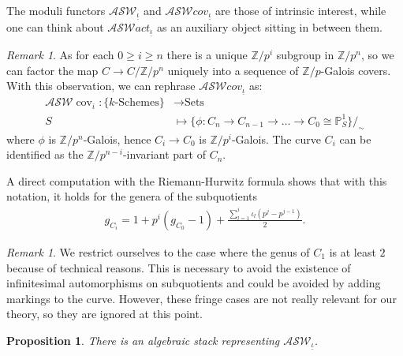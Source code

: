 \documentclass{compositio}
\newcommand{\mat}[1]{\todo[color=green]{MH: #1}}
\newtheorem{proposition}[theorem]{Proposition}
\theoremstyle{remark}
\theoremstyle{remark}
\newtheorem{remark}[theorem]{Remark}
\DeclareMathOperator{\cov}{cov}
\begin{document}
The moduli functors $\mathcal{ASW}_{\underline{\iota}}$ and $\mathcal{ASW}cov_{\underline{\iota}}$ are those of intrinsic interest, while one can think about $\mathcal{ASW}act_{\underline{\iota}}$ as an auxiliary object sitting in between them.
\begin{remark}
As for each $0 \geq i \geq n$ there is a unique $\mathbb{Z}/p^i$ subgroup in $\mathbb{Z}/p^n$, so we can factor the map $C \to C/\mathbb{Z}/p^n$ uniquely into a sequence of $\mathbb{Z}/p$-Galois covers. With this observation, we can rephrase $\mathcal{ASW}cov_{\underline{\iota}}$ as:
\begin{equation}
    \begin{split}
        \mathcal{ASW}\cov_{\overline{\iota}}: \{ k\text{-Schemes} \} & \xrightarrow{} \text{Sets} \\
        S & \mapsto \{ \phi: C_n \xrightarrow{} C_{n-1} \xrightarrow{} \ldots \xrightarrow{} C_0 \cong \mathbb{P}^1_S \}/_{\sim}
    \end{split}
\end{equation}
where $\phi$ is $\mathbb{Z}/p^n$-Galois, hence $C_i \rightarrow C_0$ is $\mathbb{Z}/p^i$-Galois. The curve $C_i$ can be identified as the $\mathbb{Z}/p^{n-i}$-invariant part of $C_n$.

A direct computation with the Riemann-Hurwitz formula shows that with this notation, it holds for the genera of the subquotients 
\begin{align}
g_{C_i}=1+ p^i(g_{C_0}-1)+\frac{\sum_{l=1}^i \iota_{l}(p^j-p^{j-1})}{2}. \label{gen-form}
\end{align}
\end{remark}

\begin{remark}
    We restrict ourselves to the case where the genus of $C_1$ is at least $2$ because of technical reasons. This is necessary to avoid the existence of infinitesimal automorphisms on subquotients and could be avoided by adding markings to the curve. However, these fringe cases are not really relevant for our theory, so they are ignored at this point.
\end{remark}


\begin{proposition}
There is an algebraic stack representing $\mathcal{ASW}_{\underline{\iota}}$.
\end{proposition}
\end{document}
